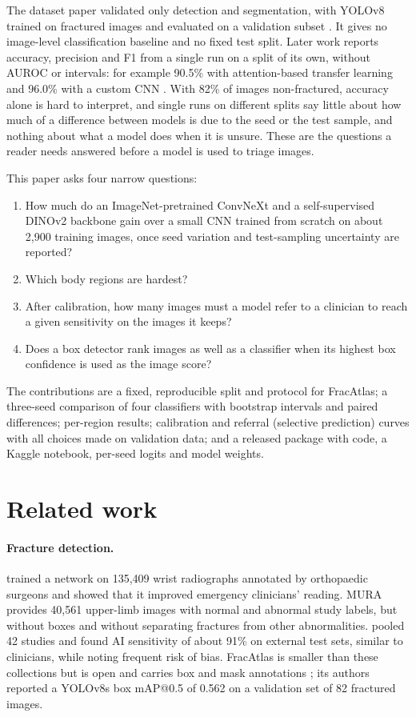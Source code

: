 \documentclass[11pt,a4paper]{article}
\begin{document}
The dataset paper validated only detection and segmentation, with YOLOv8 trained on fractured images and evaluated
on a validation subset \citep{abedeen2023fracatlas}. It gives no image-level classification baseline and no fixed
test split. Later work reports accuracy, precision and F1 from a single run on a split of its own, without AUROC or
intervals: for example 90.5\% with attention-based transfer learning \citep{ruhi2024attention} and 96.0\% with a
custom CNN \citep{hassan2025fracture}. With 82\% of images non-fractured, accuracy alone is hard to interpret, and
single runs on different splits say little about how much of a difference between models is due to the seed or the
test sample, and nothing about what a model does when it is unsure. These are the questions a reader needs answered before a model is used to triage images.

\noindent This paper asks four narrow questions:
\begin{enumerate}
\item How much do an ImageNet-pretrained ConvNeXt and a self-supervised DINOv2 backbone gain over a small CNN trained
from scratch on about 2,900 training images, once seed variation and test-sampling uncertainty are reported?
\item Which body regions are hardest?
\item After calibration, how many images must a model refer to a clinician to reach a given sensitivity on the
images it keeps?
\item Does a box detector rank images as well as a classifier when its highest box confidence is used as the image
score?
\end{enumerate}

\noindent The contributions are a fixed, reproducible split and protocol for FracAtlas; a three-seed comparison of
four classifiers with bootstrap intervals and paired differences; per-region results; calibration and
referral (selective prediction) curves with all choices made on validation data; and a released package with code, a
Kaggle notebook, per-seed logits and model weights.

\section{Related work}

\paragraph{Fracture detection.} \citet{lindsey2018fracture} trained a network on 135,409 wrist radiographs annotated
by orthopaedic surgeons and showed that it improved emergency clinicians' reading. MURA \citep{rajpurkar2017mura}
provides 40,561 upper-limb images with normal and abnormal study labels, but without boxes and without separating
fractures from other abnormalities. \citet{kuo2022fracture} pooled 42 studies and found AI sensitivity of about 91\%
on external test sets, similar to clinicians, while noting frequent risk of bias. FracAtlas is smaller than these
collections but is open and carries box and mask annotations \citep{abedeen2023fracatlas}; its authors reported a
YOLOv8s box mAP@0.5 of 0.562 on a validation set of 82 fractured images.
\end{document}
